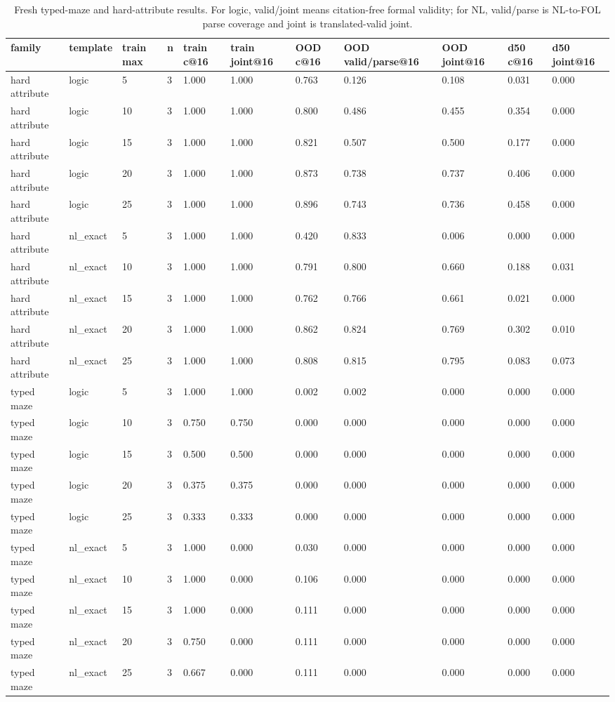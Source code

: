 \documentclass[10pt]{article}
\begin{document}
\begin{table}[H]
\centering
\scriptsize
\begin{tabular}{lllllllllll}
\toprule
family & template & train max & n & train c@16 & train joint@16 & OOD c@16 & OOD valid/parse@16 & OOD joint@16 & d50 c@16 & d50 joint@16 \\
\midrule
hard attribute & logic & 5 & 3 & 1.000 & 1.000 & 0.763 & 0.126 & 0.108 & 0.031 & 0.000 \\
hard attribute & logic & 10 & 3 & 1.000 & 1.000 & 0.800 & 0.486 & 0.455 & 0.354 & 0.000 \\
hard attribute & logic & 15 & 3 & 1.000 & 1.000 & 0.821 & 0.507 & 0.500 & 0.177 & 0.000 \\
hard attribute & logic & 20 & 3 & 1.000 & 1.000 & 0.873 & 0.738 & 0.737 & 0.406 & 0.000 \\
hard attribute & logic & 25 & 3 & 1.000 & 1.000 & 0.896 & 0.743 & 0.736 & 0.458 & 0.000 \\
hard attribute & nl\_exact & 5 & 3 & 1.000 & 1.000 & 0.420 & 0.833 & 0.006 & 0.000 & 0.000 \\
hard attribute & nl\_exact & 10 & 3 & 1.000 & 1.000 & 0.791 & 0.800 & 0.660 & 0.188 & 0.031 \\
hard attribute & nl\_exact & 15 & 3 & 1.000 & 1.000 & 0.762 & 0.766 & 0.661 & 0.021 & 0.000 \\
hard attribute & nl\_exact & 20 & 3 & 1.000 & 1.000 & 0.862 & 0.824 & 0.769 & 0.302 & 0.010 \\
hard attribute & nl\_exact & 25 & 3 & 1.000 & 1.000 & 0.808 & 0.815 & 0.795 & 0.083 & 0.073 \\
typed maze & logic & 5 & 3 & 1.000 & 1.000 & 0.002 & 0.002 & 0.000 & 0.000 & 0.000 \\
typed maze & logic & 10 & 3 & 0.750 & 0.750 & 0.000 & 0.000 & 0.000 & 0.000 & 0.000 \\
typed maze & logic & 15 & 3 & 0.500 & 0.500 & 0.000 & 0.000 & 0.000 & 0.000 & 0.000 \\
typed maze & logic & 20 & 3 & 0.375 & 0.375 & 0.000 & 0.000 & 0.000 & 0.000 & 0.000 \\
typed maze & logic & 25 & 3 & 0.333 & 0.333 & 0.000 & 0.000 & 0.000 & 0.000 & 0.000 \\
typed maze & nl\_exact & 5 & 3 & 1.000 & 0.000 & 0.030 & 0.000 & 0.000 & 0.000 & 0.000 \\
typed maze & nl\_exact & 10 & 3 & 1.000 & 0.000 & 0.106 & 0.000 & 0.000 & 0.000 & 0.000 \\
typed maze & nl\_exact & 15 & 3 & 1.000 & 0.000 & 0.111 & 0.000 & 0.000 & 0.000 & 0.000 \\
typed maze & nl\_exact & 20 & 3 & 0.750 & 0.000 & 0.111 & 0.000 & 0.000 & 0.000 & 0.000 \\
typed maze & nl\_exact & 25 & 3 & 0.667 & 0.000 & 0.111 & 0.000 & 0.000 & 0.000 & 0.000 \\
\bottomrule
\end{tabular}
\caption{Fresh typed-maze and hard-attribute results. For logic, valid/joint means citation-free formal validity; for NL, valid/parse is NL-to-FOL parse coverage and joint is translated-valid joint.}
\end{table}
\end{document}
